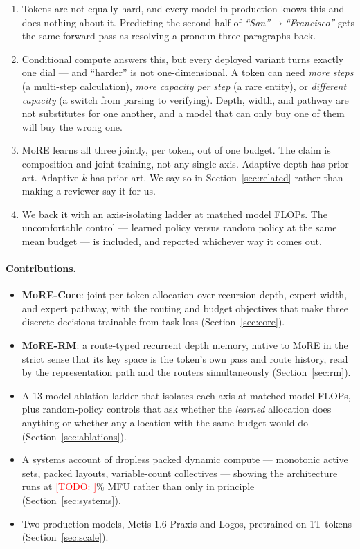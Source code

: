 \documentclass[11pt]{article}
\newcommand{\TODO}[1]{\textcolor{red}{[TODO: #1]}}
\begin{document}
\begin{enumerate}
\item Tokens are not equally hard, and every model in production knows this and
does nothing about it. Predicting the second half of \emph{``San''}$\to$\emph{``Francisco''}
gets the same forward pass as resolving a pronoun three paragraphs back.
\item Conditional compute answers this, but every deployed variant turns exactly
one dial --- and ``harder'' is not one-dimensional. A token can need \emph{more
steps} (a multi-step calculation), \emph{more capacity per step} (a rare entity),
or \emph{different capacity} (a switch from parsing to verifying). Depth, width,
and pathway are not substitutes for one another, and a model that can only buy
one of them will buy the wrong one.
\item MoRE learns all three jointly, per token, out of one budget. The claim is
composition and joint training, not any single axis. Adaptive depth has prior
art. Adaptive $k$ has prior art. We say so in Section~\ref{sec:related} rather
than making a reviewer say it for us.
\item We back it with an axis-isolating ladder at matched model FLOPs. The
uncomfortable control --- learned policy versus random policy at the same mean
budget --- is included, and reported whichever way it comes out.
\end{enumerate}

\paragraph{Contributions.}
\begin{itemize}
\item \textbf{MoRE-Core}: joint per-token allocation over recursion depth,
expert width, and expert pathway, with the routing and budget objectives that
make three discrete decisions trainable from task loss (Section~\ref{sec:core}).
\item \textbf{MoRE-RM}: a route-typed recurrent depth memory, native to MoRE in
the strict sense that its key space is the token's own pass and route history,
read by the representation path and the routers simultaneously
(Section~\ref{sec:rm}).
\item A 13-model ablation ladder that isolates each axis at matched model
FLOPs, plus random-policy controls that ask whether the \emph{learned} allocation
does anything or whether any allocation with the same budget would do
(Section~\ref{sec:ablations}).
\item A systems account of dropless packed dynamic compute --- monotonic active
sets, packed layouts, variable-count collectives --- showing the architecture runs
at \TODO{}\% MFU rather than only in principle (Section~\ref{sec:systems}).
\item Two production models, Metis-1.6 Praxis and Logos, pretrained on 1T tokens
(Section~\ref{sec:scale}).
\end{itemize}
\end{document}
